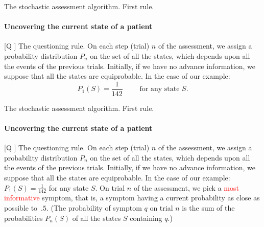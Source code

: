 \documentclass{beamer}
\def\wl{\vskip 4mm}
\def\rtxt#1{\textcolor{red}{#1}}
\begin{document}
\begin{frame}{The stochastic assessment algorithm. First rule.}
\framesubtitle{Uncovering the current state of a patient}
\center

\begin{roster}
\item[[Q\hspace{-.18cm}]] {\sc The questioning rule.} On each step (trial) $n$ of the assessment, we assign a probability distribution $P_n$ on the set of all the states, which depends upon all the events of the previous trials. 
\wl
Initially, if we have no advance information, we suppose that all the states are equiprobable. In the case of our example:  
$$P_1(S)= \frac 1{142}\qquad\text{ for any state $S$}. 
$$
\end{roster}
\vspace{.5cm}

\end{frame}

\begin{frame}{The stochastic assessment algorithm. First rule.}
\framesubtitle{Uncovering the current state of a patient}
\center

\begin{roster}
\item[[Q\hspace{-.18cm}]] {\sc The questioning rule.} On each step (trial) $n$ of the assessment, we assign a probability distribution $P_n$ on the set of all the states, which depends upon all the events of the previous trials. 
\wl
Initially, if we have no advance information, we suppose that all the states are equiprobable. In the case of our example:  $P_1(S)= \frac 1{142}$ for any state $S$. 
\wl
On trial $n$ of the assessment, we  pick a \rtxt{most informative}  symptom, that is, a symptom having a current probability as close as possible to~$.5$.  (The probability of symptom $q$ on trial $n$ is the sum of the probabilities $P_n(S)$  of all the states $S$ containing $q$.)
\end{roster}
\vspace{.5cm}

\end{frame}
\end{document}
